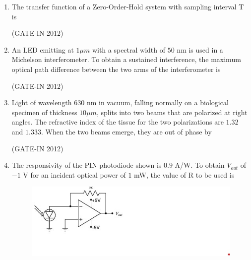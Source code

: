 \documentclass[journal,12pt,onecolumn]{IEEEtran}
\theoremstyle{remark}
\begin{document}
\begin{enumerate}
\item The transfer function of a Zero-Order-Hold system with sampling interval T is

\hfill{(GATE-IN 2012)}
\begin{enumerate}
\end{enumerate}

\item An LED emitting at $1 \mu m $ with a spectral width of $50$ nm is used in a Michelson interferometer. To obtain a sustained interference, the maximum optical path difference between the two arms of the interferometer is

\hfill{(GATE-IN 2012)}
\begin{enumerate}
\end{enumerate}

\item Light of wavelength $630$ nm in vacuum, falling normally on a biological specimen of thickness $10 \mu m$, splits into two beams that are polarized at right angles. The refractive index of the tissue for the two polarizations are $1.32$ and $1.333$. When the two beams emerge, they are out of phase by

\hfill{(GATE-IN 2012)}
\begin{enumerate}
\end{enumerate}

\item The responsivity of the PIN photodiode shown is $0.9$ A/W. To obtain $V_{out}$ of $-1$ V for an incident optical power of $1$ mW, the value of R to be used is
\begin{figure}[H]
    \centering
    \includegraphics[width=0.5\columnwidth]{figs/a8.jpg}
    \caption*{}
    \label{fig:a8}
\end{figure}


\end{enumerate}
\end{document}
